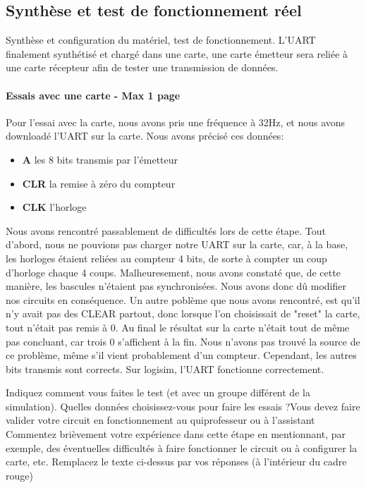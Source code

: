 \documentclass[a4paper]{article} %
\begin{document}
 \subsection{Synthèse et test de fonctionnement réel}
Synthèse et configuration du matériel, test de fonctionnement.
L’UART finalement synthétisé et chargé dans une carte, une carte émetteur sera reliée à une carte récepteur afin de tester une transmission de données. 
\begin{tcolorbox}[colframe=Monokaimagenta,colback=white]
\paragraph{Essais avec une carte - Max 1 page}
Pour l'essai avec la carte, nous avons pris une fréquence à 32Hz, et nous avons downloadé l'UART sur la carte. Nous avons précisé ces données:
\begin{itemize}
    \item     \textbf{A} les 8 bits transmis par l'émetteur
    \item     \textbf{CLR} la remise à zéro du compteur
    \item     \textbf{CLK} l'horloge
\end{itemize}

Nous avons rencontré passablement de difficultés lors de cette étape. Tout d'abord, nous ne pouvions pas charger notre UART sur la carte, car, à la base, les horloges étaient reliées au compteur 4 bits, de sorte à compter un coup d'horloge chaque 4 coups. Malheuresement, nous avons constaté que, de cette manière, les bascules n'étaient pas synchronisées. Nous avons donc dû modifier nos circuits en conséquence.
Un autre poblème que nous avons rencontré, est qu'il n'y avait pas des CLEAR partout, donc lorsque l'on choisissait de "reset" la carte, tout n'était pas remis à 0.
Au final le résultat sur la carte n'était tout de même pas concluant, car trois 0 s'affichent à la fin. Nous n'avons pas trouvé la source de ce problème, même s'il vient probablement d'un compteur. Cependant, les autres bits transmis sont corrects. Sur logisim, l'UART fonctionne correctement.

Indiquez comment vous faites le test (et avec un groupe différent de la simulation). Quelles données choisissez-vous pour faire les essais ?Vous devez faire valider votre circuit en fonctionnement au quiprofesseur ou à l’assistant
Commentez brièvement votre expérience dans cette étape en mentionnant, par exemple, des éventuelles difficultés à faire fonctionner le circuit ou à configurer la carte, etc.
Remplacez le texte ci-dessus par vos réponses (à l’intérieur du cadre rouge)
\\
\end{tcolorbox}
\end{document}
